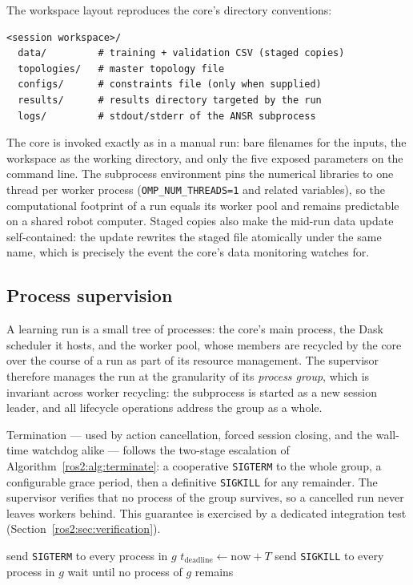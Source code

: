 The workspace layout reproduces the core's directory conventions:

\begin{lstlisting}[style=ros2iface]
<session workspace>/
  data/         # training + validation CSV (staged copies)
  topologies/   # master topology file
  configs/      # constraints file (only when supplied)
  results/      # results directory targeted by the run
  logs/         # stdout/stderr of the ANSR subprocess
\end{lstlisting}

The core is invoked exactly as in a manual run: bare filenames for the
inputs, the workspace as the working directory, and only the five exposed
parameters on the command line. The subprocess environment pins the
numerical libraries to one thread per worker process
(\texttt{OMP\_NUM\_THREADS=1} and related variables), so the computational
footprint of a run equals its worker pool and remains predictable on a
shared robot computer. Staged copies also make the mid-run data update
self-contained: the update rewrites the staged file atomically under the
same name, which is precisely the event the core's data monitoring watches
for.

\subsection{Process supervision}
\label{ros2:sec:supervision}

A learning run is a small tree of processes: the core's main process, the
Dask scheduler it hosts, and the worker pool, whose members are recycled by
the core over the course of a run as part of its resource management. The
supervisor therefore manages the run at the granularity of its
\emph{process group}, which is invariant across worker recycling: the
subprocess is started as a new session leader, and all lifecycle operations
address the group as a whole.

Termination --- used by action cancellation, forced session closing, and the
wall-time watchdog alike --- follows the two-stage escalation of
Algorithm~\ref{ros2:alg:terminate}: a cooperative \texttt{SIGTERM} to the
whole group, a configurable grace period, then a definitive \texttt{SIGKILL}
for any remainder. The supervisor verifies that no process of the group
survives, so a cancelled run never leaves workers behind. This guarantee is
exercised by a dedicated integration test
(Section~\ref{ros2:sec:verification}).

\begin{algorithm}[tb]
  \caption{Two-stage termination of a learning run's process group.}
  \label{ros2:alg:terminate}
  send \texttt{SIGTERM} to every process in $g$\;
  $t_{\mathrm{deadline}} \leftarrow \mathrm{now} + T$\;
  send \texttt{SIGKILL} to every process in $g$\;
  wait until no process of $g$ remains\;
\end{algorithm}


